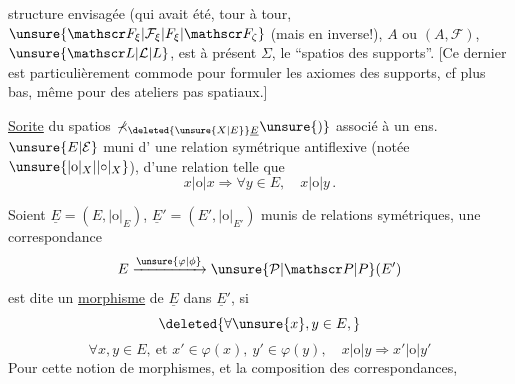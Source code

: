 structure envisagée (qui avait été, tour à tour, $\unsure{\mathscr F_\xi|\mathcal F_\xi|F_\xi|\mathscr F_\zeta}$ (mais en  inverse!), $A$ ou $(A,\mathscr F)$, $\unsure{\mathscr L|\mathcal L|L}$, est à présent $\Sigma$, le ``spatios des supports''. [Ce dernier est particulièrement commode pour formuler les axiomes des supports, cf plus bas, même pour des ateliers pas  spatiaux.]

\uline{Sorite} du \deleted{$\unsure{\mathbb\Sigma|\Sigma}$} spatios $\mathbb\Sigma_{\deleted{\unsure{X|E}}\underline E}\unsure{)}$ associé à un ens. $\unsure{E|\mathcal E}$ muni d' une relation symétrique antiflexive (notée $\unsure{|\mathrm{o}|_X|\lvert\circ\rvert_X}$),  d'une relation telle que
\[
x|\mathrm{o}|x\Longrightarrow\forall y\in E,\quad x|\mathrm{o}|y\,.
\]

 Soient $\underline E=(E,|\mathrm{o}|_E)$, $\underline E'=(E',|\mathrm{o}|_{E'})$ munis de relations symétriques, une correspondance
\[
E\xrightarrow{\unsure{\varphi|\phi}}\unsure{\mathcal P|\mathscr P|P}(E')
\]
est dite un \uline{morphisme} de $\underline E$ dans $\underline E'$, si
\[
\deleted{\forall\unsure{x},y\in E,}
\]
\[
\forall x,y\in E,\ \text{et }x'\in\varphi(x),\ y'\in\varphi(y),\quad x|\mathrm{o}|y\Longrightarrow x'|\mathrm{o}|y'
\]
Pour cette notion de morphismes, et la  composition des correspondances,


